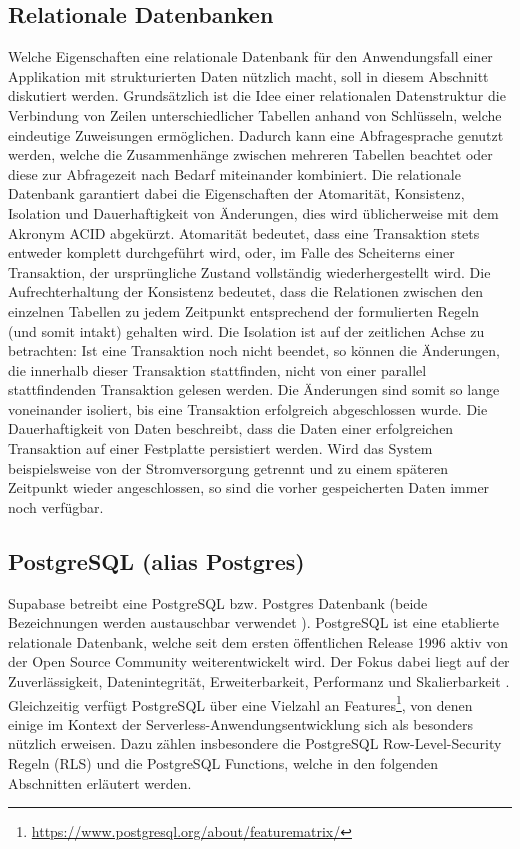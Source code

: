 \subsection{Relationale Datenbanken}
Welche Eigenschaften eine relationale Datenbank für den Anwendungsfall einer Applikation mit strukturierten Daten nützlich macht, soll in diesem Abschnitt diskutiert werden. Grundsätzlich ist die Idee einer relationalen Datenstruktur die Verbindung von Zeilen unterschiedlicher Tabellen anhand von Schlüsseln, welche eindeutige Zuweisungen ermöglichen. Dadurch kann eine Abfragesprache genutzt werden, welche die Zusammenhänge zwischen mehreren Tabellen beachtet oder diese zur Abfragezeit nach Bedarf miteinander kombiniert. Die relationale Datenbank garantiert dabei die Eigenschaften der Atomarität, Konsistenz, Isolation und Dauerhaftigkeit von Änderungen, dies wird üblicherweise mit dem Akronym ACID abgekürzt. Atomarität bedeutet, dass eine Transaktion stets entweder komplett durchgeführt wird, oder, im Falle des Scheiterns einer Transaktion, der ursprüngliche Zustand vollständig wiederhergestellt wird. Die Aufrechterhaltung der Konsistenz bedeutet, dass die Relationen zwischen den einzelnen Tabellen zu jedem Zeitpunkt entsprechend der formulierten Regeln (und somit intakt) gehalten wird. Die Isolation ist auf der zeitlichen Achse zu betrachten: Ist eine Transaktion noch nicht beendet, so können die Änderungen, die innerhalb dieser Transaktion stattfinden, nicht von einer parallel stattfindenden Transaktion gelesen werden. Die Änderungen sind somit so lange voneinander isoliert, bis eine Transaktion erfolgreich abgeschlossen wurde. Die Dauerhaftigkeit von Daten beschreibt, dass die Daten einer erfolgreichen Transaktion auf einer Festplatte persistiert werden. Wird das System beispielsweise von der Stromversorgung getrennt und zu einem späteren Zeitpunkt wieder angeschlossen, so sind die vorher gespeicherten Daten immer noch verfügbar.
\subsection{PostgreSQL (alias Postgres)}
Supabase betreibt eine PostgreSQL bzw. Postgres Datenbank (beide Bezeichnungen werden austauschbar verwendet \cite{PagePostgres}). PostgreSQL ist eine etablierte relationale Datenbank, welche seit dem ersten öffentlichen Release 1996 aktiv von der Open Source Community weiterentwickelt wird. Der Fokus dabei liegt auf der Zuverlässigkeit, Datenintegrität, Erweiterbarkeit, Performanz und Skalierbarkeit \cite[vgl.][]{PostgresAbout}. Gleichzeitig verfügt PostgreSQL über eine Vielzahl an Features\footnote{\url{https://www.postgresql.org/about/featurematrix/}}, von denen einige im Kontext der Serverless-Anwendungsentwicklung sich als besonders nützlich erweisen. Dazu zählen insbesondere die PostgreSQL Row-Level-Security Regeln (RLS) und die PostgreSQL Functions, welche in den folgenden Abschnitten erläutert werden.
